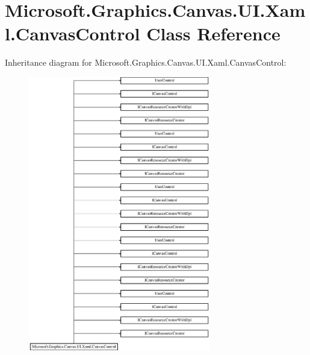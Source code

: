 \hypertarget{class_microsoft_1_1_graphics_1_1_canvas_1_1_u_i_1_1_xaml_1_1_canvas_control}{}\section{Microsoft.\+Graphics.\+Canvas.\+U\+I.\+Xaml.\+Canvas\+Control Class Reference}
\label{class_microsoft_1_1_graphics_1_1_canvas_1_1_u_i_1_1_xaml_1_1_canvas_control}
Inheritance diagram for Microsoft.\+Graphics.\+Canvas.\+U\+I.\+Xaml.\+Canvas\+Control\+:\begin{figure}[H]
\begin{center}
\leavevmode
\includegraphics[height=12.000000cm]{class_microsoft_1_1_graphics_1_1_canvas_1_1_u_i_1_1_xaml_1_1_canvas_control}
\end{center}
\end{figure}
